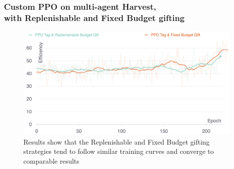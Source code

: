 \documentclass{beamer}
\begin{document}
\begin{frame}
	\frametitle{Custom PPO on multi-agent Harvest, \\with Replenishable and Fixed Budget gifting}
	\begin{figure}
		\centering
		\includegraphics[width=0.9\linewidth]{../assets/ppo-gifting-fixed-vs-replenishable-efficiency.png}
		\caption*{Results show that the Replenishable and Fixed Budget gifting strategies tend to follow similar training curves and converge to comparable results}
	\end{figure}
\end{frame}
\end{document}
